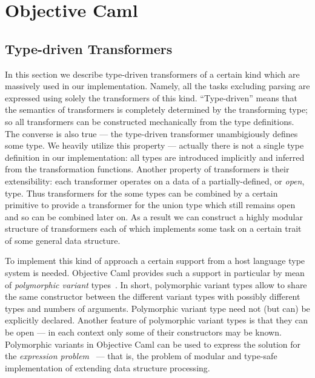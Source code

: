 \section{Objective Caml}

\cite{OcamlDef, PV, PVReuse, Exproblem, Remy, Monads, MonadicParserCombinators}

\subsection{Type-driven Transformers}

In this section we describe type-driven transformers of a certain kind which are 
massively used in our implementation. Namely, all the tasks excluding parsing
are expressed using solely the transformers of this kind. ``Type-driven'' means that
the semantics of transformers is completely determined by the transforming type; 
so all transformers can be constructed mechanically from the type definitions.
The converse is also true --- the type-driven transformer unambigiously defines
some type. We heavily utilize this property --- actually there is not a single 
type definition in our implementation: all types are introduced implicitly 
and inferred from the transformation functions. Another property of transformers
is their extensibility: each transformer operates on a data of a partially-defined, 
or \emph{open}, type. Thus transformers for the some types can be combined by a certain primitive
to provide a transformer for the union type which still remains open and so can be
combined later on. As a result we can construct a highly modular structure of
transformers each of which implements some task on a certain trait of some general
data structure. 

To implement this kind of approach a certain support from a host language type 
system is needed. Objective Caml provides such a support in particular by mean of 
\emph{polymorphic variant} types~\cite{PV}. In short, polymorphic variant types allow to 
share the same constructor between the different variant types with possibly different 
types and numbers of arguments. Polymorphic variant type need not (but can) be explicitly
declared. Another feature of polymorphic variant types is that they can be open --- in each
context only some of their constructors may be known. Polymorphic variants in Objective Caml 
can be used to express the solution for the \emph{expression problem}~\cite{Exproblem, PVReuse} --- 
that is, the problem of modular and type-safe implementation of extending data structure 
processing. 

